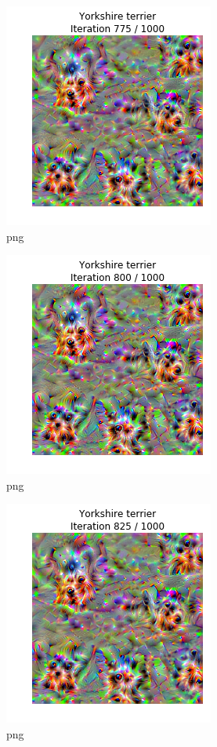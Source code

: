 \documentclass[]{book}
\theoremstyle{definition}
\theoremstyle{definition}
\theoremstyle{definition}
\theoremstyle{remark}
\begin{document}
\begin{figure}
\centering
\includegraphics{Network-Visualization-TensorFlow_files/Network-Visualization-TensorFlow_24_32.png}
\caption{png}
\end{figure}

\begin{figure}
\centering
\includegraphics{Network-Visualization-TensorFlow_files/Network-Visualization-TensorFlow_24_33.png}
\caption{png}
\end{figure}

\begin{figure}
\centering
\includegraphics{Network-Visualization-TensorFlow_files/Network-Visualization-TensorFlow_24_34.png}
\caption{png}
\end{figure}
\end{document}
